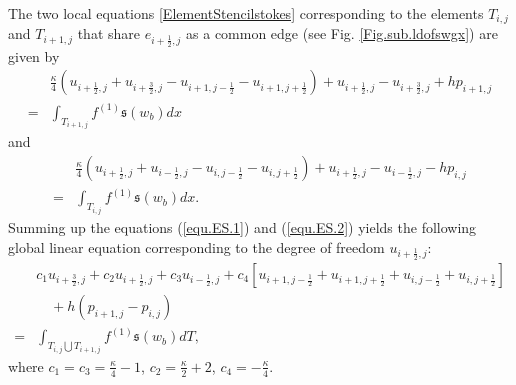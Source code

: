 \documentclass[final,leqno]{siamltex704}
\def\S{{\mathfrak s}}
\begin{document}
The two local equations \eqref{ElementStencilstokes} corresponding to the elements $T_{i,j}$ and $T_{i+1,j}$ that share $e_{i+\frac{1}{2},j}$ as a common edge (see Fig. \ref{Fig.sub.ldofswgx}) are given by
\begin{equation}\label{equ.ES.1}
\begin{split}
& \frac{\kappa}{4}(u_{i+\frac{1}{2},j}+u_{i+\frac{3}{2},j} -u_{i+1,j-\frac{1}{2}}-u_{i+1,j+\frac{1}{2}})+ u_{i+\frac{1}{2},j}-u_{i+\frac{3}{2},j} +h p_{i+1,j}\\
=&\int_{T_{i+1,j}} f^{(1)} \S(w_b)dx
\end{split}
\end{equation}
and
\begin{equation}\label{equ.ES.2}
\begin{split}
&\frac{\kappa}{4}(u_{i+\frac{1}{2},j}+u_{i-\frac{1}{2},j} -u_{i,j-\frac{1}{2}}-u_{i,j+\frac{1}{2}})+ u_{i+\frac{1}{2},j}-u_{i-\frac{1}{2},j} -h p_{i,j}\\
=&\int_{T_{i,j}} f^{(1)} \S(w_b)dx.
\end{split}
\end{equation}
Summing up the equations (\ref{equ.ES.1}) and (\ref{equ.ES.2}) yields the following global linear equation corresponding to the degree of freedom $u_{i+\frac{1}{2},j}$:
\begin{equation}\label{equ.DFSWG.1}
\begin{split}
& c_1u_{i+\frac{3}{2},j}+ c_2u_{i+\frac{1}{2},j}+ c_3u_{i-\frac{1}{2},j} +c_4[u_{i+1,j-\frac{1}{2}}+u_{i+1,j+\frac{1}{2}}+u_{i,j-\frac{1}{2}}
+u_{i,j+\frac{1}{2}}] \\
& \quad +h(p_{i+1,j}-p_{i,j})\\
 = & \int_{T_{i,j}\bigcup T_{i+1,j}} f^{(1)} \S(w_b)dT,
\end{split}
\end{equation}
where $\displaystyle c_1=c_3 = \frac{\kappa}{4}-1$, $\displaystyle c_2 = \frac{\kappa}{2}+2$, $\displaystyle c_4=-\frac{\kappa}{4}$.
\end{document}
